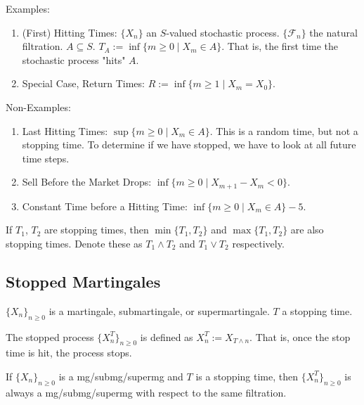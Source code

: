 \documentclass[english, course]{Notes}
\begin{document}
Examples:

\begin{enumerate}
	\item (First) Hitting Times: $\{X_n\}$ an $S$-valued stochastic process. $\{\mathcal{F}_n\}$ the natural filtration. $A \subseteq S$. $T_A := \inf \{m \geq 0 \mid X_m \in A\}$. That is, the first time the stochastic process "hits" $A$.
	\item Special Case, Return Times: $R := \inf\{m \geq 1 \mid X_m = X_0\}$.
\end{enumerate}

Non-Examples:

\begin{enumerate}
	\item Last Hitting Times: $\sup\{m \geq 0 \mid X_m \in A\}$. This is a random time, but not a stopping time. To determine if we have stopped, we have to look at all future time steps.
	\item Sell Before the Market Drops: $\inf \{m \geq 0 \mid X_{m+1} - X_m < 0\}$.
	\item Constant Time before a Hitting Time: $\inf\{m \geq 0 \mid X_m \in A\} - 5$. 
\end{enumerate}

\begin{claim}
	If $T_1$, $T_2$ are stopping times, then $\min\{T_1, T_2\}$ and $\max\{T_1, T_2\}$ are also stopping times. Denote these as $T_1 \wedge T_2$ and $T_1 \vee T_2$ respectively. 
\end{claim}

\subsection{Stopped Martingales}

$\{X_n\}_{n \geq 0}$ is a martingale, submartingale, or supermartingale. $T$ a stopping time.

\begin{definition}
	The stopped process $\{X_n^T\}_{n \geq 0}$ is defined as $X_n^T := X_{T \wedge n}$. That is, once the stop time is hit, the process stops.
\end{definition}

\begin{theorem}
	If $\{X_n\}_{n \geq 0}$ is a mg/submg/supermg and $T$ is a stopping time, then $\{X_n^T\}_{n \geq 0}$ is always a mg/submg/supermg with respect to the same filtration.
\end{theorem}
\end{document}
